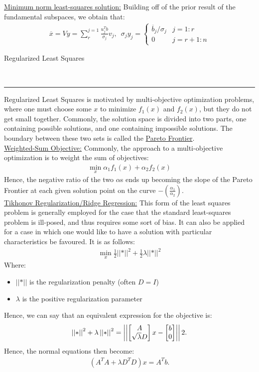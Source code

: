 \documentclass{article}
\newcommand{\header}[1]{\begin{large}\noindent #1\end{large}\\\rule{\textwidth}{0.5pt}}
\newcommand{\norm}[2]{\left\lvert\left\lvert#1\right\rvert\right\rvert}
\newcommand{\sheader}[1]{\underline{#1:}}
\newcommand{\gap}{\medskip\\}
\begin{document}
\sheader{Minimum norm least-squares solution} Building off of the prior result of the fundamental 
subspaces, we obtain that:
\begin{align*}
    \overline{x} = Vy = \sum_{r}^{j=1}\frac{u_j^T b}{\sigma_j}v_j, \,\,\, \sigma_j y_j = \begin{cases}
        \overline{b}_j/ \sigma_j & j = 1:r \\
        0 & j = r + 1 : n
    \end{cases}
\end{align*}
\pagebreak

\header{Regularized Least Squares}
Regularized Least Squares is motivated by multi-objective optimization problems, where 
one must choose some $x$ to minimize $f_1(x)$ and $f_2(x)$, but they do not get small together.
Commonly, the solution space is divided into two parts, one containing possible solutions, and 
one containing impossible solutions. The boundary between these two sets is called the \underline{Pareto Frontier}.
\gap
\sheader{Weighted-Sum Objective} Commonly, the approach to a multi-objective optimization is 
to weight the sum of objectives:
\begin{align*}
    \min_{x} \alpha_1f_1(x) + \alpha_2f_2(x)
\end{align*}
Hence, the negative ratio of the two $\alpha$s ends up becoming the slope of the Pareto Frontier
at each given solution point on the curve $-\left(\frac{\alpha_1}{\alpha_2}\right)$.
\gap
\sheader{Tikhonov Regularization/Ridge Regression} This form of the least squares problem 
is generally employed for the case that the standard least-squares problem is ill-posed, and 
thus requires some sort of bias. It can also be applied for a case in which one would like 
to have a solution with particular characteristics be favoured. It is as follows:
\begin{align*}
    \min_x \frac{1}{2} \norm*{Ax - b}^2 + \frac{1}{2} \lambda \norm*{Dx}^2
\end{align*}
Where:
\begin{itemize}
    \item $\norm*{Dx^2}$ is the regularization penalty (often $D = I$)
    \item $\lambda$ is the positive regularization parameter
\end{itemize}
Hence, we can say that an equivalent expression for the objective is:
\begin{align*}
    \norm*{Ax - b}^2 + \lambda\norm*{Dx}^2 = \norm{\begin{bmatrix}
        A \\
        \sqrt{\lambda}D
    \end{bmatrix}x - \begin{bmatrix}
        b\\
        0
    \end{bmatrix}}^2.
\end{align*}
Hence, the normal equations then become:
\begin{align*}
    (A^TA + \lambda D^T D)x = A^T b.
\end{align*}
\end{document}
